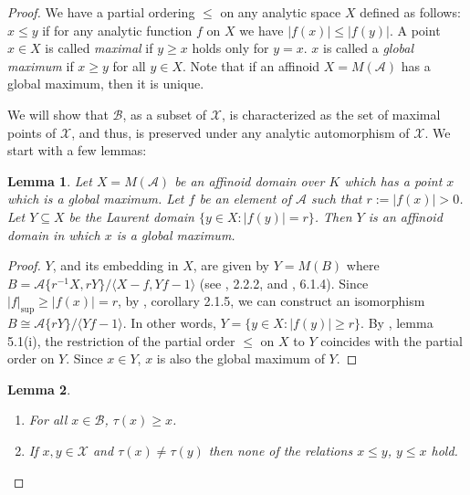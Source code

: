 \documentclass{amsart}
\theoremstyle{theorem}
\theoremstyle{lemma}
\newtheorem{lemma}{Lemma}[section]
\theoremstyle{prop}
\theoremstyle{definition}
\theoremstyle{corollary}
\theoremstyle{remark}
\newcommand{\AF}{\mathcal{A}}
\newcommand{\B}{\mathcal{B}}
\newcommand{\X}{\mathcal{X}}
\begin{document}
\begin{proof}
We have a partial ordering $\leq$ on any analytic space $X$ defined as follows: $x \leq y$ if for any analytic function $f$ on $X$ we have $|f(x)|\leq |f(y)|$. A point $x\in X$ is called \emph{maximal} if $y\geq x$ holds only for $y=x$. $x$ is called a \emph{global maximum} if $x \geq y$ for all $y\in X$. Note that if an affinoid $X=M(\AF)$ has a global maximum, then it is unique.

We will show that $\B$, as a subset of $\X$, is characterized as the set of maximal points of $\X$, and thus, is preserved under any analytic automorphism of $\X$. We start with a few lemmas:

\begin{lemma}\label{unimax} Let $X=M(\AF)$ be an affinoid domain over $K$ which has a point $x$ which is a global maximum. Let $f$ be an element of $\AF$ such that $r:=|f(x)|>0$. Let $Y \subseteq X$ be the Laurent domain $\{y\in X : |f(y)|=r\}$. Then $Y$ is an affinoid domain in which $x$ is a global maximum. \end{lemma}

\begin{proof} $Y$, and its embedding in $X$, are given by $Y=M(B)$ where $B=\AF\{r^{-1}X,rY\}/\langle X-f,Yf-1 \rangle$ (see  \cite{ber2}, 2.2.2, and \cite{bgr}, 6.1.4). Since $|f|_{\sup} \geq |f(x)| =r$, by \cite{ber2}, corollary 2.1.5, we can construct an isomorphism $B\cong \AF \{rY\}/\langle Yf-1 \rangle$. In other words, $Y= \{ y\in X : |f(y)|\geq r\}$. By \cite{ber3}, lemma 5.1(i), the restriction of the partial order $\leq$ on $X$ to $Y$ coincides with the partial order on $Y$. Since $x\in Y$, $x$ is also the global maximum of $Y$. \end{proof}

\begin{lemma} \begin{enumerate}
\item
For all $x\in \B$, $\tau(x) \geq x$.
\item
If $x,y\in \X$ and $\tau(x) \neq \tau(y)$ then none of the relations $x \leq y$, $y \leq x$ hold.
\end{enumerate}
\end{lemma}


\end{proof}
\end{document}

